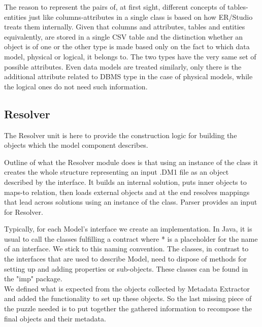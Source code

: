 The reason to represent the pairs of, at first sight, different concepts of tables-entities just like columns-attributes in a single class is based on how ER/Studio treats them internally. Given that columns and attributes, tables and entities equivalently, are stored in a single CSV table and the distinction whether an object is of one or the other type is made based only on the fact to which data model, physical or logical, it belongs to.
The two types have the very same set of possible attributes. 
Even data models are treated similarly, only there is the additional attribute related to DBMS type in the case of physical models, while the logical ones do not need such information.

\subsection{Resolver}

The Resolver unit is here to provide the construction logic for building the objects which the model component describes.

Outline of what the Resolver module does is that using an instance of the  class it creates the whole structure representing an input .DM1 file as an object described by the  interface. 
It builds an internal solution, puts inner objects to maps-to relation, then loads external objects and at the end resolves mappings that lead across solutions using an instance of the  class.
Parser provides an input for Resolver.

Typically, for each Model's interface we create an implementation. 
In Java, it is usual to call the classes fulfilling a contract  where * is a placeholder for the name of an interface. We stick to this naming convention. 
The  classes, in contrast to the interfaces that are used to describe Model, need to dispose of methods for setting up and adding properties or sub-objects. These classes can be found in the "imp" package. \\

We defined what is expected from the objects collected by Metadata Extractor and added the functionality to set up these objects.
So the last missing piece of the puzzle needed is to put together the gathered information to recompose the final objects and their metadata.

